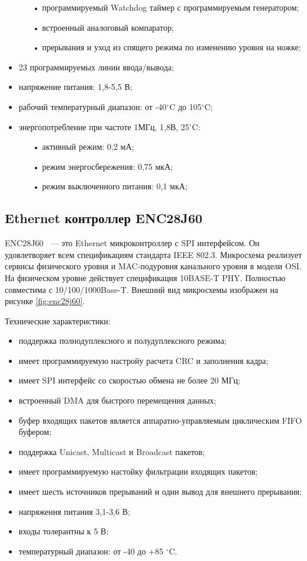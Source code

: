\begin{itemize}
\begin{itemize}
		\item[•] программируемый Watchdog таймер с программируемым генератором;
		\item[•] встроенный аналоговый компаратор;
		\item[•] прерывания и уход из спящего режима по изменению уровня на ножке;
	\end{itemize}
	\item 23 программируемых линии ввода/вывода;
	\item напряжение питания: 1,8-5,5 В;
	\item рабочий температурный диапазон: от -40$^{\circ}$C до 105$^{\circ}$C;
	\item энергопотребление при частоте 1МГц, 1,8В, 25$^{\circ}$C:
	\begin{itemize}
		\item[•] активный режим: 0,2 мА;
		\item[•] режим энергосбережения: 0,75 мкА;
		\item[•] режим выключенного питания: 0,1 мкА;
	\end{itemize}
\end{itemize}

\subsection{Ethernet контроллер ENC28J60}

ENC28J60 ~--- это Ethernet микроконтроллер с SPI интерфейсом. Он удовлетворяет всем спецификациям стандарта IEEE 802.3. Микросхема реализует сервисы физического уровня и MAC-подуровня канального уровня в модели OSI. На физическом уровне действует спецификация 10BASE-T PHY. Полностью совместима с 10/100/1000Base-T. Внешний вид микросхемы изображен на рисунке \ref{fig:enc28j60}.

Технические характеристики\cite{enc28j60datasheet}:
\begin{itemize}
	\item поддержка полнодуплексного и полудуплексного режима;
	\item имеет программируемую настройу расчета CRC и заполнения кадра;
	\item имеет SPI интерфейс со скоростью обмена не более 20 МГц;
	\item встроенный DMA для быстрого перемещения данных;
	\item буфер входящих пакетов является аппаратно-управляемым циклическим FIFO буфером;
	\item поддержка Unicast, Multicast и Broadcast пакетов;
	\item имеет программируемую настойку фильтрации входящих пакетов;
	\item имеет шесть источников прерываний и один вывод для внешнего прерывания;
	\item напряжения питания 3,1-3,6 В;
	\item входы толерантны к 5 В;
	\item температурный диапазон:  от -40 до +85 $^{\circ}$C.
\end{itemize}

